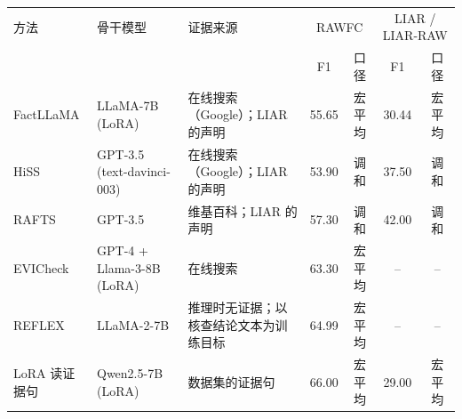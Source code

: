 \begin{tabular}{llp{4.6cm}cccc}
\toprule
方法 & 骨干模型 & 证据来源 & \multicolumn{2}{c}{RAWFC} & \multicolumn{2}{c}{LIAR / LIAR-RAW} \\
 & & & F1 & 口径 & F1 & 口径 \\
\midrule
FactLLaMA\citep{cheung2023factllama} & LLaMA-7B (LoRA) & 在线搜索（Google）；LIAR 的声明 & 55.65 & 宏平均 & 30.44 & 宏平均 \\
HiSS\citep{zhang2023hiss} & GPT-3.5 (text-davinci-003) & 在线搜索（Google）；LIAR 的声明 & 53.90 & 调和 & 37.50 & 调和 \\
RAFTS\citep{yue2024rafts} & GPT-3.5 & 维基百科；LIAR 的声明 & 57.30 & 调和 & 42.00 & 调和 \\
EVICheck\citep{wang2025evicheck} & GPT-4 + Llama-3-8B (LoRA) & 在线搜索 & 63.30 & 宏平均 & -- & -- \\
REFLEX\citep{kong2026reflex} & LLaMA-2-7B & 推理时无证据；以核查结论文本为训练目标 & 64.99 & 宏平均 & -- & -- \\
LoRA 读证据句\citep{kumar2025entailed} & Qwen2.5-7B (LoRA) & 数据集的证据句 & 66.00 & 宏平均 & 29.00 & 宏平均 \\
\bottomrule
\end{tabular}
